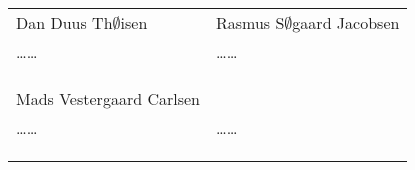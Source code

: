 \documentclass{article}
\begin{document}
\noindent
\begin{tabular}{p{70mm}p{70mm}}

%
%

Dan Duus Th$\emptyset$isen & Rasmus S$\emptyset$gaard Jacobsen \\
\dots\dotfill\dots & \dots\dotfill\dots \\
& \\
& \\
& \\

Mads Vestergaard Carlsen &\\
\dots\dotfill\dots & \dots\dotfill\dots \\
& \\
& \\
& \\
\end{tabular}
\end{document}
